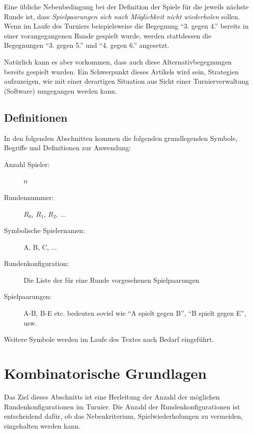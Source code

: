 \documentclass[DIV=15, 10pt]{scrartcl}
\begin{document}
Eine übliche Nebenbedingung bei der Definition der Spiele für die jeweils nächste Runde ist, dass \emph{Spielpaarungen sich nach Möglichkeit nicht wiederholen} sollen. Wenn im Laufe des Turniers beispielsweise die Begegnung "`3. gegen 4."' bereits in einer vorangegangenen Runde gespielt wurde, werden stattdessen die Begegnungen "`3. gegen 5."' und "`4. gegen 6."' angesetzt.

Natürlich kann es aber vorkommen, dass auch diese Alternativbegegnungen bereits gespielt wurden. Ein Schwerpunkt dieses Artikels wird sein, Strategien aufzuzeigen, wie mit einer derartigen Situation aus Sicht einer Turnierverwaltung (Software) umgegangen werden kann.

\subsection{Definitionen}

In den folgenden Abschnitten kommen die folgenden grundlegenden Symbole, Begriffe und Definitionen zur Anwendung:

\begin{description}

\item[Anzahl Spieler:] $n$

\item[Rundennummer:] $R_0$, $R_1$, $R_2$, ...

\item[Symbolische Spielernamen:] A, B, C, ...

\item[Rundenkonfiguration:] Die Liste der für eine Runde vorgesehenen Spielpaarungen

\item[Spielpaarungen:] A-B, B-E etc. bedeuten soviel wie "`A spielt gegen B"', "`B spielt gegen E"', usw.

\end{description}

Weitere Symbole werden im Laufe des Textes nach Bedarf eingeführt.

\section{Kombinatorische Grundlagen} 

Das Ziel dieses Abschnitts ist eine Herleitung der Anzahl der möglichen Rundenkonfigurationen im Turnier. Die Anzahl der Rundenkonfigurationen ist entscheidend dafür, ob das Nebenkriterium, Spielwiederholungen zu vermeiden, eingehalten werden kann.
\end{document}

